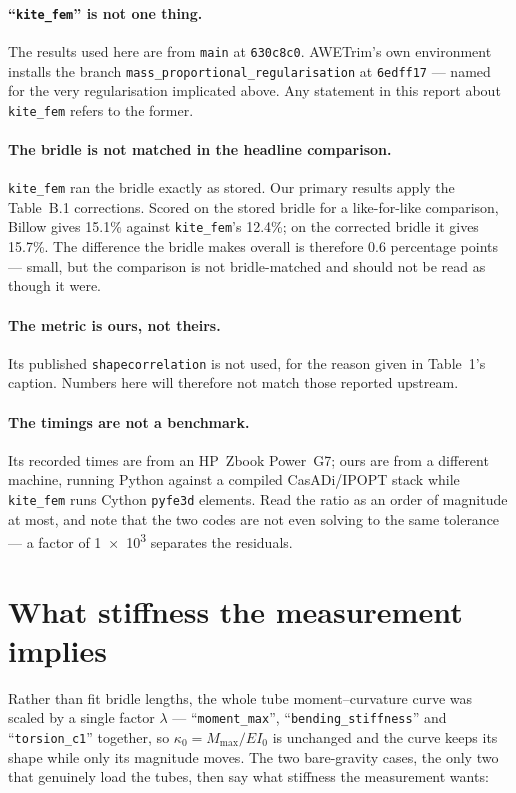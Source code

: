 \documentclass[11pt,a4paper]{article}
\begin{document}
\paragraph{``\texttt{kite\_fem}'' is not one thing.} The results used here are
from \texttt{main} at \texttt{630c8c0}. AWETrim's own environment installs the
branch \texttt{mass\_proportional\_regularisation} at \texttt{6edff17} --- named
for the very regularisation implicated above. Any statement in this report about
\texttt{kite\_fem} refers to the former.

\paragraph{The bridle is not matched in the headline comparison.}
\texttt{kite\_fem} ran the bridle exactly as stored. Our primary results apply
the Table~B.1 corrections. Scored on the stored bridle for a like-for-like
comparison, Billow gives 15.1\% against \texttt{kite\_fem}'s 12.4\%; on the
corrected bridle it gives 15.7\%. The difference the bridle makes overall is
therefore \SI{0.6}{} percentage points --- small, but the comparison is not
bridle-matched and should not be read as though it were.

\paragraph{The metric is ours, not theirs.} Its published
\texttt{shapecorrelation} is not used, for the reason given in Table~1's
caption. Numbers here will therefore not match those reported upstream.

\paragraph{The timings are not a benchmark.} Its recorded times are from an
HP~Zbook Power~G7; ours are from a different machine, running Python against a
compiled CasADi/IPOPT stack while \texttt{kite\_fem} runs Cython
\texttt{pyfe3d} elements. Read the ratio as an order of magnitude at most, and
note that the two codes are not even solving to the same tolerance --- a factor
of \num{1e3} separates the residuals.

\section{What stiffness the measurement implies}
\label{sec:lambda}

Rather than fit bridle lengths, the whole tube moment--curvature curve was
scaled by a single factor $\lambda$ --- ``\texttt{moment\_max}'',
``\texttt{bending\_stiffness}'' and ``\texttt{torsion\_c1}'' together, so
$\kappa_0 = M_\text{max}/EI_0$ is unchanged and the curve keeps its shape while
only its magnitude moves. The two bare-gravity cases, the only two that
genuinely load the tubes, then say what stiffness the measurement wants:
\end{document}
